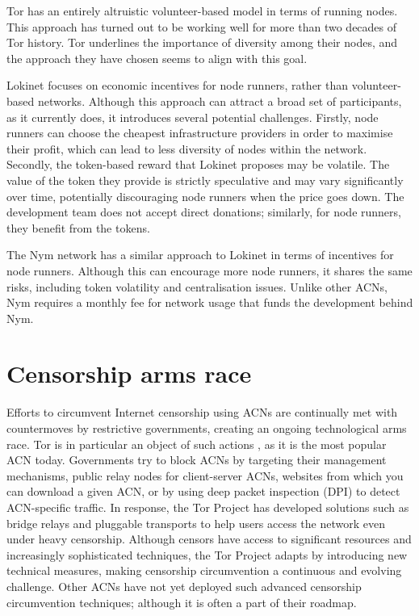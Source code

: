 Tor has an entirely altruistic volunteer-based model in terms of running nodes. This approach has turned out to be working well for more than two decades of Tor history. Tor underlines the importance of diversity among their nodes, and the approach they have chosen seems to align with this goal.

Lokinet focuses on economic incentives for node runners, rather than volunteer-based networks. Although this approach can attract a broad set of participants, as it currently does, it introduces several potential challenges. Firstly, node runners can choose the cheapest infrastructure providers in order to maximise their profit, which can lead to less diversity of nodes within the network. Secondly, the token-based reward that Lokinet proposes may be volatile. The value of the token they provide is strictly speculative and may vary significantly over time, potentially discouraging node runners when the price goes down. The development team does not accept direct donations; similarly, for node runners, they benefit from the tokens.

The Nym network has a similar approach to Lokinet in terms of incentives for node runners. Although this can encourage more node runners, it shares the same risks, including token volatility and centralisation issues. Unlike other ACNs, Nym requires a monthly fee for network usage that funds the development behind Nym.

\section{Censorship arms race}
Efforts to circumvent Internet censorship using ACNs are continually met with countermoves by restrictive governments, creating an ongoing technological arms race. Tor is in particular an object of such actions \cite{tor-arms-race}, as it is the most popular ACN today. Governments try to block ACNs by targeting their management mechanisms, public relay nodes for client-server ACNs, websites from which you can download a given ACN, or by using deep packet inspection (DPI) to detect ACN-specific traffic. In response, the Tor Project has developed solutions such as bridge relays and pluggable transports to help users access the network even under heavy censorship. Although censors have access to significant resources and increasingly sophisticated techniques, the Tor Project adapts by introducing new technical measures, making censorship circumvention a continuous and evolving challenge. Other ACNs have not yet deployed such advanced censorship circumvention techniques; although it is often a part of their roadmap.
